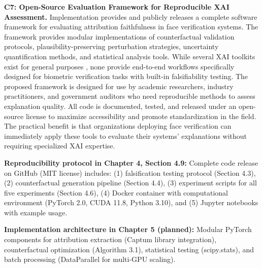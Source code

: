 \textbf{C7: Open-Source Evaluation Framework for Reproducible XAI Assessment.} Implementation provides and publicly releases a complete software framework for evaluating attribution faithfulness in face verification systems. The framework provides modular implementations of counterfactual validation protocols, plausibility-preserving perturbation strategies, uncertainty quantification methods, and statistical analysis tools. While several XAI toolkits exist for general purposes \cite{kokhlikyan2020captum,lundberg2017unified}, none provide end-to-end workflows specifically designed for biometric verification tasks with built-in falsifiability testing. The proposed framework is designed for use by academic researchers, industry practitioners, and government auditors who need reproducible methods to assess explanation quality. All code is documented, tested, and released under an open-source license to maximize accessibility and promote standardization in the field. The practical benefit is that organizations deploying face verification can immediately apply these tools to evaluate their systems' explanations without requiring specialized XAI expertise.

\vspace{0.3cm}
\noindent\textbf{Reproducibility protocol in Chapter 4, Section 4.9:} Complete code release on GitHub (MIT license) includes: (1) falsification testing protocol (Section 4.3), (2) counterfactual generation pipeline (Section 4.4), (3) experiment scripts for all five experiments (Section 4.6), (4) Docker container with computational environment (PyTorch 2.0, CUDA 11.8, Python 3.10), and (5) Jupyter notebooks with example usage.

\vspace{0.3cm}
\noindent\textbf{Implementation architecture in Chapter 5 (planned):} Modular PyTorch components for attribution extraction (Captum library integration), counterfactual optimization (Algorithm 3.1), statistical testing (scipy.stats), and batch processing (DataParallel for multi-GPU scaling).

\vspace{0.5cm}

